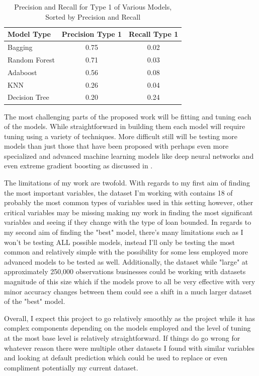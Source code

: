 \documentclass[12pt]{article}
\begin{document}
\begin{table}[htbp]
    \centering
    \caption{Precision and Recall for Type 1 of Various Models, Sorted by Precision and Recall}
    \label{tab:precision_recall}
    \begin{tabular}{lcc}
        \toprule
        Model Type      & Precision Type 1 & Recall Type 1 \\
        \midrule
        Bagging         & 0.75 & 0.02 \\
        Random Forest   & 0.71 & 0.03 \\
        Adaboost        & 0.56 & 0.08 \\
        KNN             & 0.26 & 0.04 \\
        Decision Tree   & 0.20 & 0.24 \\
        \bottomrule
    \end{tabular}
    \label{table:type1finalresults}
\end{table}

The most challenging parts of the proposed work will be fitting and tuning each of the models. While straightforward in building them each model will require tuning using a variety of techniques. More difficult still will be testing more models than just those that have been proposed with perhaps even more specialized and advanced machine learning models like deep neural networks and even extreme gradient boosting as discussed in \citet{lai2020loan}. 

The limitations of my work are twofold. With regards to my first aim of finding the most important variables, the dataset I'm working with contains 18 of probably the most common types of variables used in this setting however, other critical variables may be missing making my work in finding the most significant variables and seeing if they change with the type of loan bounded. In regards to my second aim of finding the "best" model, there's many limitations such as I won't be testing ALL possible models, instead I'll only be testing the most common and relatively simple with the possibility for some less employed more advanced models to be tested as well. Additionally, the dataset while "large" at approximately 250,000 observations businesses could be working with datasets magnitude of this size which if the models prove to all be very effective with very minor accuracy changes between them could see a shift in a much larger dataset of the "best" model.  

Overall, I expect this project to go relatively smoothly as the project while it has complex components depending on the models employed and the level of tuning at the most base level is relatively straightforward. If things do go wrong for whatever reason there were multiple other datasets I found with similar variables and looking at default prediction which could be used to replace or even compliment potentially my current dataset.



\end{document}
